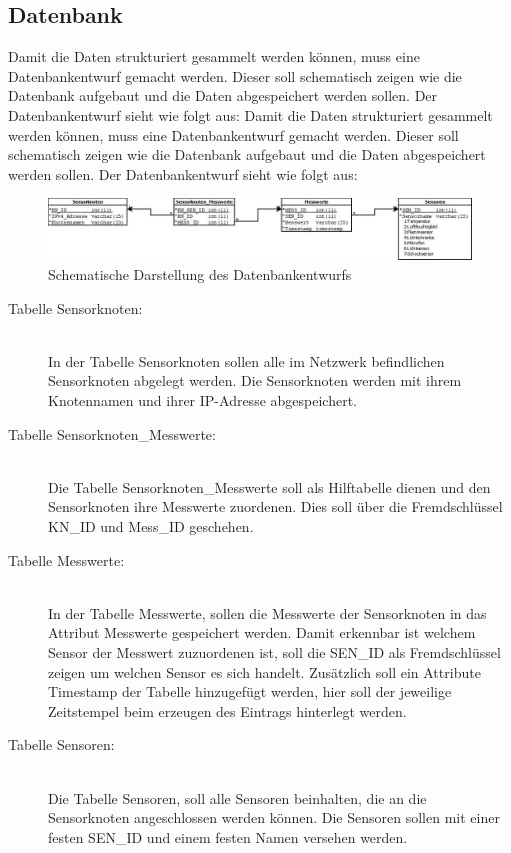 \subsection{Datenbank}\label{sub:Datenbank}
Damit die Daten strukturiert gesammelt werden können, muss eine Datenbankentwurf gemacht werden. Dieser soll schematisch zeigen wie die Datenbank aufgebaut und die Daten abgespeichert werden sollen. Der Datenbankentwurf sieht wie folgt aus:
Damit die Daten strukturiert gesammelt werden können, muss eine Datenbankentwurf gemacht werden. Dieser soll schematisch zeigen wie die Datenbank aufgebaut und die Daten abgespeichert werden sollen. Der Datenbankentwurf sieht wie folgt aus:
\begin{landscape}
	\begin{figure}[ht]
		\begin{center}
			\includegraphics[width=\paperwidth]{Bilder/Kapitel3/Datenbankentwurf.jpeg}
			\caption[Schematische Darstellung des Datenbankentwurfs]{Schematische Darstellung des Datenbankentwurfs}
			\label{fig:Datenbankentwurf}
		\end{center}
	\end{figure}
\end{landscape}
\begin{description}
	\item[Tabelle Sensorknoten:] \hfill \\
		In der Tabelle Sensorknoten sollen alle im Netzwerk befindlichen Sensorknoten abgelegt werden. Die Sensorknoten werden mit ihrem Knotennamen und ihrer IP-Adresse abgespeichert.
	\item[Tabelle Sensorknoten\_Messwerte:] \hfill \\
		Die Tabelle Sensorknoten\_Messwerte soll als Hilftabelle dienen und den Sensorknoten ihre Messwerte zuordenen. Dies soll über die Fremdschlüssel KN\_ID und Mess\_ID geschehen.
	\item[Tabelle Messwerte:] \hfill \\
		In der Tabelle Messwerte, sollen die Messwerte der Sensorknoten in das Attribut Messwerte gespeichert werden. Damit erkennbar ist welchem Sensor der Messwert zuzuordenen ist, soll die SEN\_ID als Fremdschlüssel zeigen um welchen Sensor es sich handelt. Zusätzlich soll ein Attribute Timestamp der Tabelle hinzugefügt werden, hier soll der jeweilige Zeitstempel beim erzeugen des Eintrags hinterlegt werden.
	\item[Tabelle Sensoren:] \hfill \\	
		Die Tabelle Sensoren, soll alle Sensoren beinhalten, die an die Sensorknoten angeschlossen werden können. Die Sensoren sollen mit einer festen SEN\_ID und einem festen Namen versehen werden.
\end{description}

